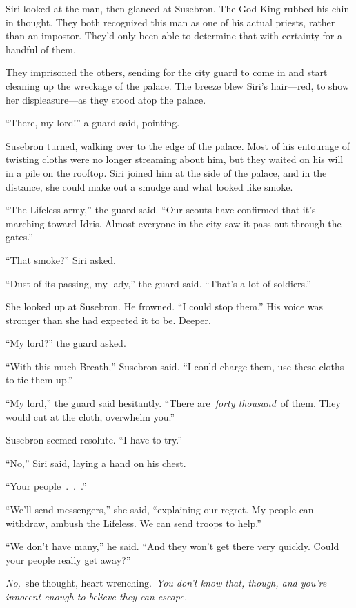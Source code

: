 Siri looked at the man, then glanced at Susebron. The God King rubbed his chin in thought. They both recognized this man as one of his actual priests, rather than an impostor. They’d only been able to determine that with certainty for a handful of them.

They imprisoned the others, sending for the city guard to come in and start cleaning up the wreckage of the palace. The breeze blew Siri’s hair—red, to show her displeasure—as they stood atop the palace.

“There, my lord!” a guard said, pointing.

Susebron turned, walking over to the edge of the palace. Most of his entourage of twisting cloths were no longer streaming about him, but they waited on his will in a pile on the rooftop. Siri joined him at the side of the palace, and in the distance, she could make out a smudge and what looked like smoke.

“The Lifeless army,” the guard said. “Our scouts have confirmed that it’s marching toward Idris. Almost everyone in the city saw it pass out through the gates.”

“That smoke?” Siri asked.

“Dust of its passing, my lady,” the guard said. “That’s a lot of soldiers.”

She looked up at Susebron. He frowned. “I could stop them.” His voice was stronger than she had expected it to be. Deeper.

“My lord?” the guard asked.

“With this much Breath,” Susebron said. “I could charge them, use these cloths to tie them up.”

“My lord,” the guard said hesitantly. “There are~\textit{forty thousand}~of them. They would cut at the cloth, overwhelm you.”

Susebron seemed resolute. “I have to try.”

“No,” Siri said, laying a hand on his chest.

“Your people~.~.~.”

“We’ll send messengers,” she said, “explaining our regret. My people can withdraw, ambush the Lifeless. We can send troops to help.”

“We don’t have many,” he said. “And they won’t get there very quickly. Could your people really get away?”

\textit{No,}~she thought, heart wrenching.~\textit{You don’t know that, though, and you’re innocent enough to believe they can escape.}

